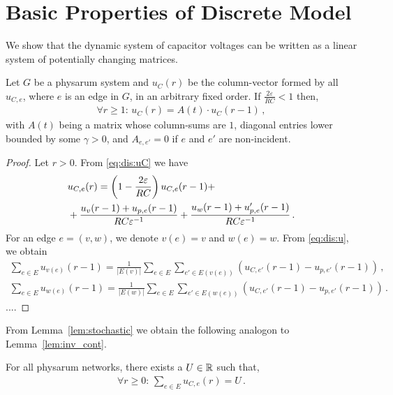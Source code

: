 \medskip


\section{Basic Properties of Discrete Model}\label{sec:basic_disc}

We show that the dynamic system of capacitor voltages can be written as a linear system of potentially changing matrices.

\begin{lem}\label{lem:stochastic}
Let $G$ be a physarum system and $u_C(r)$ be the column-vector formed by all $u_{C,e}$, where $e$ is an edge in $G$, in an arbitrary fixed order.
If $\frac{2\varepsilon}{RC} < 1$ then,  
\begin{align}
\forall r\ge 1:\,u_C(r)=A(t) \cdot u_C(r-1)\,,
\end{align}
with $A(t)$ being a matrix whose column-sums are $1$, diagonal entries lower bounded by some $\gamma > 0$, and $A_{e,e'} = 0$
  if $e$ and $e'$ are non-incident.
\end{lem}
\begin{proof}
Let $r > 0$.
From \eqref{eq:dis:uC} we have
\begin{align}
  &u_{C,e}(r) = \left(1-\frac{2\varepsilon}{RC}\right)u_{C,e}(r-1) +\notag\\
  &+\frac{u_v(r-1)+u_{p,e}(r-1)}{RC\varepsilon^{-1}} + \frac{u_w(r-1)+u'_{p,e}(r-1)}{RC\varepsilon^{-1}}\,.\label{eq:dis:uC2}
\end{align}
For an edge $e = (v,w)$, we denote $v(e) = v$ and $w(e) = w$.
From \eqref{eq:dis:u}, we obtain
\begin{align}
\sum_{e \in E}u_{v(e)}(r-1) = \frac{1}{|E(v)|}\sum_{e \in E}\sum_{e' \in E(v(e))}(u_{C,e'}(r-1)-u_{p,e'}(r-1))\,,\label{eq:dis:u:v1}\\
\sum_{e \in E}u_{w(e)}(r-1) = \frac{1}{|E(w)|}\sum_{e \in E}\sum_{e' \in E(w(e))}(u_{C,e'}(r-1)-u_{p,e'}(r-1))\,.\label{eq:dis:u:w1}
\end{align}
....

\end{proof}

From Lemma~\ref{lem:stochastic} we obtain the following analogon to Lemma~\ref{lem:inv_cont}.
\begin{lem}\label{cor:inv_disc}
For all physarum networks, there exists a $U \in \mathbb{R}$ such that,
\begin{align}
\forall r\ge 0:\,\sum_{e \in E}u_{C,e}(r) = U\,.
\end{align}
\end{lem}